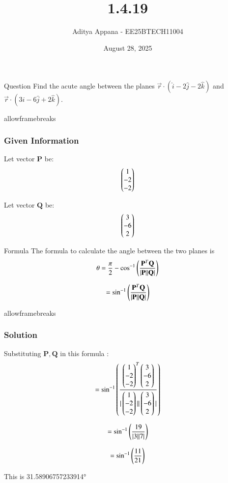 \documentclass{beamer}
\title %
{1.4.19}
\date{August 28, 2025}
\author %
{Aditya Appana - EE25BTECH11004}
\begin{document}
\frame{\titlepage}
\begin{frame}{Question}
Find the acute angle between the planes $ \vec{r} \cdot (\hat{i} - 2\hat{j} - 2\hat{k})$ and  $ \vec{r} \cdot (3\hat{i} - 6\hat{j} + 2\hat{k})$.

\end{frame}
\begin{frame}{allowframebreaks}
\frametitle{Given Information}

    \centering
    
    \label{tab:parameters}
    
    
    Let vector $\mathbf{P}$ be: \begin{align}
    \begin{pmatrix}1\\-2\\-2\end{pmatrix}
    \end{align}
    

    Let vector $\mathbf{Q}$ be: \begin{align}\begin{pmatrix}3\\-6\\2\end{pmatrix}\end{align}
    \label{0.2}

   
\end{frame}


\begin{frame}{Formula}
The formula to calculate the angle between the two planes is
\
$$ \theta = \frac{\pi}{2} - \cos^{-1}\left(\frac{\mathbf{P}^T\mathbf{Q}}{|\mathbf{P}||\mathbf{Q}|}\right)$$

$$= \sin^{-1}\left(\frac{\mathbf{P}^T\mathbf{Q}}{|\mathbf{P}||\mathbf{Q}|}\right)$$


\end{frame}

\begin{frame}{allowframebreaks}
\frametitle{Solution}
Substituting $\mathbf{P, Q}$ in this formula :
$$= \sin^{-1}\left(\frac{\begin{pmatrix}1\\-2\\-2\end{pmatrix}^T\begin{pmatrix}3\\-6\\2\end{pmatrix}}{|\begin{pmatrix}1\\-2\\-2\end{pmatrix}||\begin{pmatrix}3\\-6\\2\end{pmatrix}|}\right)$$


$$= \sin^{-1}\left(\frac{19}{|3||7|}\right)$$

$$= \sin^{-1}\left(\frac{11}{21}\right)$$

\centering
This is 31.58906757233914°
\end{frame}
\end{document}
